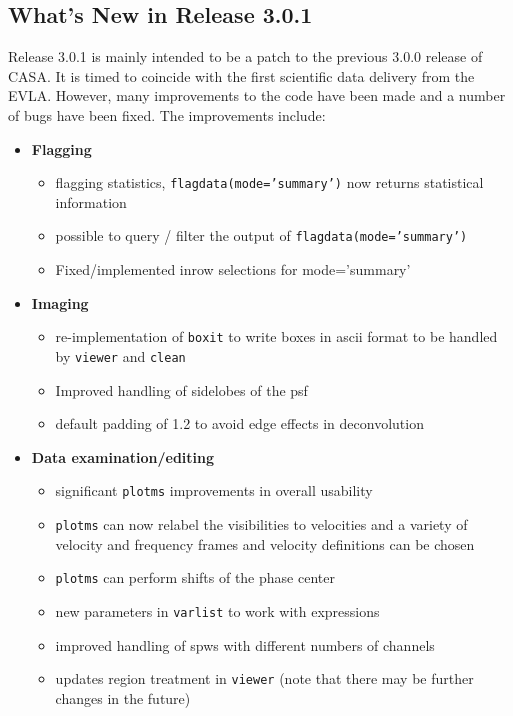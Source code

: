 \subsection{What's New in Release 3.0.1}
\label{section:intro.release.whatsnew}

Release 3.0.1 is mainly intended to be a patch to the previous 3.0.0
release of CASA. It is timed to coincide with the first scientific
data delivery from the EVLA. However, many improvements to the code
have been made and a number of bugs have been fixed. The improvements include:

\begin{itemize}

\item {\bf Flagging}
    \begin{itemize}
   \item flagging statistics, {\tt flagdata(mode='summary')} now   returns statistical information
     \item         possible to query / filter the output of  {\tt flagdata(mode='summary')}
      \item     Fixed/implemented inrow selections for mode='summary'
    \end{itemize}

\item {\bf Imaging}
   \begin{itemize}    
    \item re-implementation of {\tt boxit} to write boxes in ascii format to
      be handled by {\tt viewer} and {\tt clean}
      \item Improved handling of sidelobes of the psf
        \item default padding of 1.2 to avoid edge effects in deconvolution
   \end{itemize}

\item {\bf Data examination/editing}
  \begin{itemize}
    \item significant {\tt plotms} improvements in overall usability
      \item {\tt plotms} can now relabel the visibilities to 
        velocities and a variety of velocity and frequency frames and
        velocity definitions can be chosen
        \item {\tt plotms} can perform shifts of the phase center
          \item new parameters in {\tt varlist} to work with
            expressions
            \item improved handling of spws with different numbers of
              channels
              \item updates region treatment in {\tt viewer} (note
                that there may be further changes in the future)
   \end{itemize}


\end{itemize}
